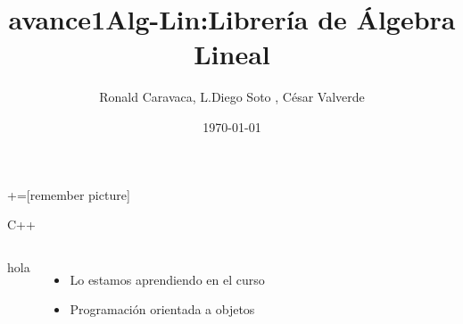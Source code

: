 \documentclass{beamer} %
\title{avance1}
\title[Alg-Lin]{Alg-Lin:Librer\'ia de \'Algebra Lineal}
\institute[]{Enterprise}
\author[A91329, B26613, A86605]{Ronald Caravaca, L.Diego Soto , C\'esar Valverde}
\date{\today}
\begin{document}
+=[remember picture]
\lstset{language=C++}   
\everymath{\displaystyle}

\begin{frame}

	\titlepage
\end{frame}



\begin{frame}{C++}


\begin{columns}
 hola

\begin{itemize}
\item Lo estamos aprendiendo en el curso
\item Programaci\'on orientada a objetos 
\end{itemize}


\end{columns}

\end{frame}
\end{document}
